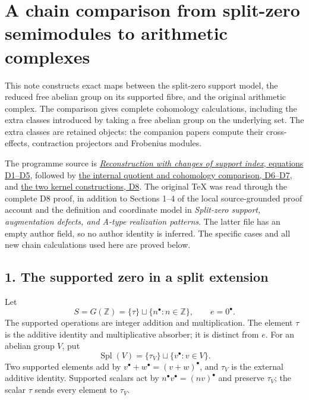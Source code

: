 \documentclass[
]{article}
\author{}
\date{}
\begin{document}
{
\setcounter{tocdepth}{3}
\tableofcontents
}
\section{A chain comparison from split-zero semimodules to arithmetic
complexes}\label{a-chain-comparison-from-split-zero-semimodules-to-arithmetic-complexes}

This note constructs exact maps between the split-zero support model,
the reduced free abelian group on its supported fibre, and the original
arithmetic complex. The comparison gives complete cohomology
calculations, including the extra classes introduced by taking a free
abelian group on the underlying set. The extra classes are retained
objects: the companion papers compute their cross-effects, contraction
projectors and Frobenius modules.

The programme source is
\href{https://github.com/KokunoYumeto/zeta-function-research-reader/blob/39ced92952a9c807d51500783b221beb141da3b6/workbenches/splitzero-tandem/tex/support_diagrams.tex\#L9}{\emph{Reconstruction
with changes of support index}, equations D1--D5}, followed by
\href{https://github.com/KokunoYumeto/zeta-function-research-reader/blob/39ced92952a9c807d51500783b221beb141da3b6/workbenches/splitzero-tandem/tex/support_diagrams.tex\#L125}{the
internal quotient and cohomology comparison, D6--D7}, and
\href{https://github.com/KokunoYumeto/zeta-function-research-reader/blob/39ced92952a9c807d51500783b221beb141da3b6/workbenches/splitzero-tandem/tex/support_diagrams.tex\#L178}{the
two kernel constructions, D8}. The original TeX was read through the
complete D8 proof, in addition to Sections 1--4 of the local
source-grounded proof account and the definition and coordinate model in
\emph{Split-zero support, augmentation defects, and A-type realization
patterns}. The latter file has an empty author field, so no author
identity is inferred. The specific cases and all new chain calculations
used here are proved below.

\subsection{1. The supported zero in a split
extension}\label{the-supported-zero-in-a-split-extension}

Let \[
S=G(\mathbb Z)=\{\tau\}\sqcup\{n^\bullet:n\in\mathbb Z\},
\qquad e=0^\bullet.
\tag{Q1}
\] The supported operations are integer addition and multiplication. The
element \(\tau\) is the additive identity and multiplicative absorber;
it is distinct from \(e\). For an abelian group \(V\), put \[
\operatorname{Spl}(V)=\{\tau_V\}\sqcup\{v^\bullet:v\in V\}.
\tag{Q2}
\] Two supported elements add by \(v^\bullet+w^\bullet=(v+w)^\bullet\),
and \(\tau_V\) is the external additive identity. Supported scalars act
by \(n^\bullet v^\bullet=(nv)^\bullet\) and preserve \(\tau_V\); the
scalar \(\tau\) sends every element to \(\tau_V\).
\end{document}
